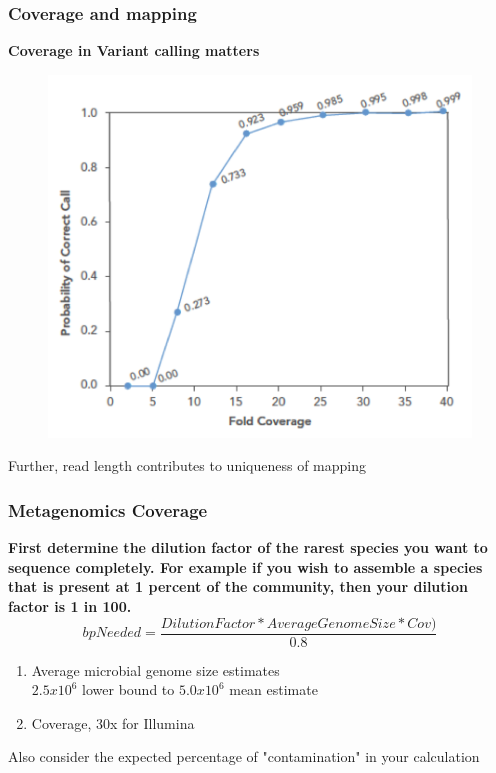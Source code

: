 \documentclass{beamer}
\begin{document}
\begin{frame}
\frametitle{Coverage and mapping}
\textbf{Coverage in Variant calling matters}

\begin{figure}[htbp]
\begin{center}
   \includegraphics[scale=0.5]{mapping.png}
\end{center}
\end{figure}
\begin{alert}
Further, read length contributes to uniqueness of mapping
\end{alert}
\end{frame}

\begin{frame}
\frametitle{Metagenomics Coverage}
\textbf{First determine the dilution factor of the rarest species you want to sequence completely. For example if you wish to assemble a species that is present at 1 percent of the community, then your dilution factor is 1 in 100.}
\begin{equation*}
bpNeeded = \frac{DilutionFactor*AverageGenomeSize*Cov)}{0.8}
\end{equation*}
\begin{enumerate}
\item Average microbial genome size estimates\\ $2.5x10^6$ lower bound to $5.0x10^6$ mean estimate 
\item Coverage, 30x for Illumina
\end{enumerate}
\begin{alert}
Also consider the expected percentage of "contamination" in your calculation
\end{alert}
\end{frame}
\end{document}

